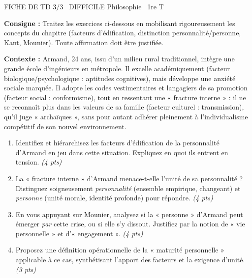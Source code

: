 \documentclass[11pt]{article}
\begin{document}
\begin{tcolorbox}[enhanced,colback=popink,colframe=popink,arc=10pt,boxrule=0pt,left=12pt,right=12pt,top=9pt,bottom=9pt]
{\color{white}\popxbold\small FICHE DE TD 3/3 \textbullet\ DIFFICILE \hfill Philosophie \textbullet\ 1re T\par}
\end{tcolorbox}
\vspace{4pt}
\noindent \textbf{Consigne :} Traitez les exercices ci-dessous en mobilisant rigoureusement les concepts du chapitre (facteurs d'édification, distinction personnalité/personne, Kant, Mounier). Toute affirmation doit être justifiée.

\begin{exercice}
\textbf{Contexte :} Armand, 24 ans, issu d'un milieu rural traditionnel, intègre une grande école d'ingénieurs en métropole. Il excelle académiquement (facteur biologique/psychologique : aptitudes cognitives), mais développe une anxiété sociale marquée. Il adopte les codes vestimentaires et langagiers de sa promotion (facteur social : conformisme), tout en ressentant une « fracture interne » : il ne se reconnaît plus dans les valeurs de sa famille (facteur culturel : transmission), qu'il juge « archaïques », sans pour autant adhérer pleinement à l'individualisme compétitif de son nouvel environnement.
\begin{enumerate}
    \item Identifiez et hiérarchisez les facteurs d'édification de la personnalité d'Armand en jeu dans cette situation. Expliquez en quoi ils entrent en tension. \textit{(4 pts)}
    \item La « fracture interne » d'Armand menace-t-elle l'unité de sa personnalité ? Distinguez soigneusement \textit{personnalité} (ensemble empirique, changeant) et \textit{personne} (unité morale, identité profonde) pour répondre. \textit{(4 pts)}
    \item En vous appuyant sur Mounier, analysez si la « personne » d'Armand peut émerger \textit{par} cette crise, ou si elle s'y dissout. Justifiez par la notion de « vie personnelle » et d'« engagement ». \textit{(4 pts)}
    \item Proposez une définition opérationnelle de la « maturité personnelle » applicable à ce cas, synthétisant l'apport des facteurs et la exigence d'unité. \textit{(3 pts)}
\end{enumerate}
\end{exercice}
\end{document}
